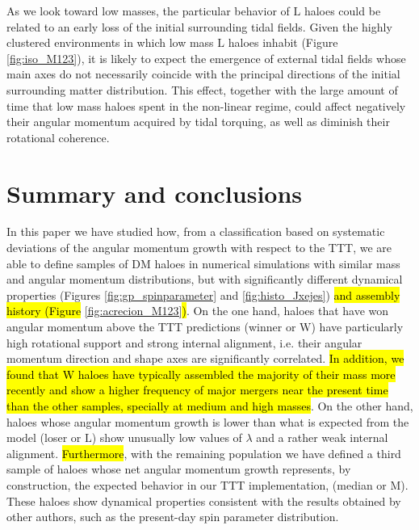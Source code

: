 \documentclass[fleqn,usenatbib]{mnras}
\newcommand{\Wh}{\mathrm{W}}
\newcommand{\Lh}{\mathrm{L}}
\newcommand{\Mh}{\mathrm{M}}
\begin{document}
As we look toward low masses, the particular behavior of $\Lh$ haloes could be related to an early loss of the initial surrounding tidal fields. Given the highly clustered environments in which low mass $\Lh$ haloes inhabit (Figure \ref{fig:iso_M123}), it is likely to expect the emergence of external tidal fields whose main axes do not necessarily coincide with the principal directions of the initial surrounding matter distribution. This effect, together with the large amount of time that low mass haloes spent in the non-linear regime, could affect negatively their angular momentum acquired by tidal torquing, as well as diminish their rotational coherence.

\section{Summary and conclusions}
\label{conclusions}

In this paper we have studied how, from a classification based on systematic deviations of the angular momentum growth with respect to the TTT, we are able to define samples of DM haloes in numerical simulations with similar mass and angular momentum distributions, but with significantly different dynamical properties (Figures \ref{fig:gp_spinparameter} and \ref{fig:histo_Jxejes}) \hl{and assembly history (Figure }\ref{fig:acrecion_M123}\hl{)}. On the one hand, haloes that have won angular momentum above the TTT predictions ({winner} or $\Wh$) have particularly high rotational support and strong internal alignment, i.e. their angular momentum direction and shape axes are significantly correlated. \hl{In addition, we found that $\Wh$ haloes have typically assembled the majority of their mass more recently and show a higher frequency of major mergers near the present time than the other samples, specially at medium and high masses}. On the other hand, haloes whose angular momentum growth is lower than what is expected from the model ({loser} or $\Lh$) show unusually low values of $\lambda$ and a rather weak internal alignment. \hl{Furthermore}, with the remaining population we have defined a third sample of haloes whose net angular momentum growth represents, by construction, the expected behavior in our TTT implementation, ({median} or $\Mh$). These haloes show dynamical properties consistent with the results obtained by other authors, such as the present-day spin parameter distribution.
\end{document}
